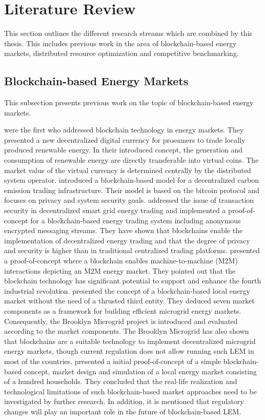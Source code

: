 \section{Literature Review}
\label{sec:literature_review}
This section outlines the different research streams which are 
combined by this thesis. This includes previous work in the area of 
blockchain-based energy markets, distributed resource optimization
and competitive benchmarking.

\subsection{Blockchain-based Energy Markets}
\label{sec:Blockchain-based Energy Markets}
This subsection presents previous work on the topic of blockchain-based energy markets.

 were the first who addressed blockchain technology in
energy markets. They presented a new decentralized digital currency for prosumers to trade locally produced renewable energy.
In their introduced concept, the generation and consumption of renewable energy are directly
transferable into virtual coins. The market value of the virtual currency is determined
centrally by the distributed system operator. 
 introduced a blockchain-based
model for a decentralized carbon emission trading infrastructure.
Their model is based on the bitcoin protocol and focuses on privacy and system security goals.
 addressed the issue of transaction security in
decentralized smart grid energy trading and implemented a proof-of-concept for a
blockchain-based energy trading system including anonymous encrypted messaging streams.
They have shown that blockchains enable the implementation of decentralized energy trading and that the degree
of privacy and security is higher than in traditional centralized trading platforms.
 presented a proof-of-concept where a blockchain enables machine-to-machine (M2M) interactions depicting an
M2M energy market. They pointed out that the blockchain technology has
significant potential to support and enhance the fourth industrial revolution.
presented the concept of a blockchain-based local energy market without the need of a thrusted
third entity. They deduced seven market
components as a framework for building efficient microgrid energy markets. Consequently,
the Brooklyn Microgrid project is introduced and evaluated according to the market components.
The Brooklyn Microgrid has also shown that blockchains are a suitable technology
to implement decentralized microgrid energy markets, though current regulation does not
allow running such LEM in most of the countries. 
presented a initial proof-of-concept of a simple blockchain-based concept, market design and
simulation of a local energy market consisting of a hundred households.
They concluded that the real-life realization and technological limitations of such blockchain-based
market approaches need to be investigated by further research. 
In addition, it is mentioned that regulatory
changes will play an important role in the future of blockchain-based LEM.

